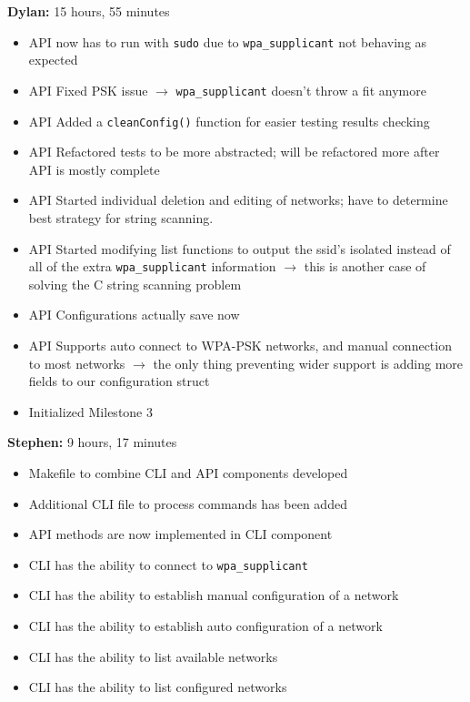 \documentclass[11pt]{article}
\begin{document}
\textbf{Dylan:} 15 hours, 55 minutes
\begin{itemize}
  \item API now has to run with \texttt{sudo} due to \texttt{wpa\_supplicant} not behaving as expected
  \item API Fixed PSK issue $\rightarrow$ \texttt{wpa\_supplicant} doesn't throw a fit anymore
  \item API Added a \texttt{cleanConfig()} function for easier testing results checking
  \item API Refactored tests to be more abstracted; will be refactored more after API is mostly complete
  \item API Started individual deletion and editing of networks; have to determine best strategy for string scanning.
  \item API Started modifying list functions to output the ssid's isolated instead of all of the extra \texttt{wpa\_supplicant}
    information $\rightarrow$ this is another case of solving the C string scanning problem
  \item API Configurations actually save now
  \item API Supports auto connect to WPA-PSK networks, and manual connection to most networks $\rightarrow$ the only thing
    preventing wider support is adding more fields to our configuration struct
  \item Initialized Milestone 3
\end{itemize}

\textbf{Stephen:} 9 hours, 17 minutes
\begin{itemize}
  \item Makefile to combine CLI and API components developed 
  \item Additional CLI file to process commands has been added
  \item API methods are now implemented in CLI component
  \item CLI has the ability to connect to \texttt{wpa\_supplicant}
  \item CLI has the ability to establish manual configuration of a network
  \item CLI has the ability to establish auto configuration of a network 
  \item CLI has the ability to list available networks 
  \item CLI has the ability to list configured networks 
\end{itemize}
\end{document}
